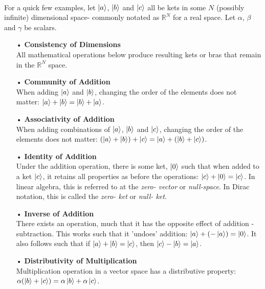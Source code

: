 \documentclass[12pt,letterpaper]{book}
\begin{document}
\paragraph*{}For a quick few examples, let $\ket{a}$, $\ket{b}$ and $\ket{c}$ all be kets in some $N$ (possibly infinite) dimensional space- commonly notated as $\mathbb{R}^N$ for a real space. Let $\alpha$, $\beta$ and $\gamma$ be scalars. 

\begin{enumerate}

\item[•]\textbf{Consistency of Dimensions}\\
All mathematical operations below produce resulting kets or bras that remain in the $\mathbb{R}^N$ space.

\item[•]\textbf{Community of Addition}\\
When adding $\ket{a}$ and $\ket{b}$, changing the order of the elements does not matter: 
$\ket{a} + \ket{b} = \ket{b} + \ket{a}$. 

\item[•]\textbf{Associativity of Addition}\\
When adding combinations of $\ket{a}$, $\ket{b}$ and $\ket{c}$, changing the order of the elements does not matter:
$(\ket{a} + \ket{b}) + \ket{c} = \ket{a} + (\ket{b} + \ket{c})$.

\item[•]\textbf{Identity of Addition}\\
Under the addition operation, there is some ket, $\ket{0}$ such that when added to a ket $\ket{c}$, it retains all properties as before the operations: $\ket{c} + \ket{0} = \ket{c}$. In linear algebra, this is referred to at the \textit{zero- vector} or \textit{null-space}. In Dirac notation, this is called the \textit{zero- ket} or \textit{null- ket}.

\item[•]\textbf{Inverse of Addition}\\
There exists an operation, much that it has the opposite effect of addition - subtraction. This works such that it 'undoes' addition: $\ket{a}+ (-\ket{a}) = \ket{0}$. It also follows such that if $\ket{a} + \ket{b} = \ket{c}$, then $\ket{c} - \ket{b} = \ket{a}$.

\item[•]\textbf{Distributivity of Multiplication }\\
Multiplication operation in a vector space has a distributive property: $\alpha(\ket{b} + \ket{c}) = \alpha\ket{b} + \alpha\ket{c}$.


\end{enumerate}
\end{document}
